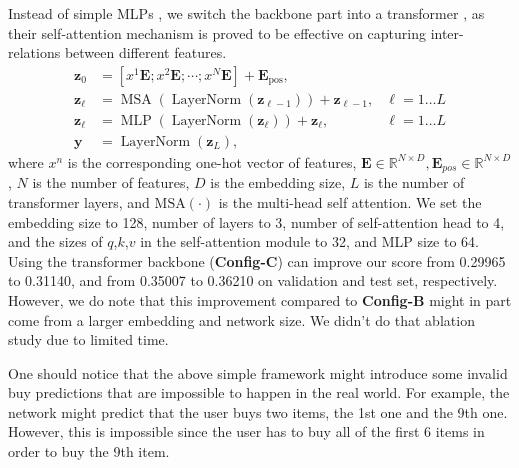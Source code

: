 Instead of simple MLPs \cite{din, ncf}, we switch the backbone part into a transformer \cite{transformer}, as their self-attention mechanism is proved to be effective on capturing inter-relations between different features.
\begin{equation}
\begin{aligned}
\mathbf{z}_{0} &=\left[x^{1} \mathbf{E} ; x^{2} \mathbf{E}; \cdots; x^{N} \mathbf{E}\right]+\mathbf{E}_{\text{pos}}, &  \\
\mathbf{z}_{\ell} &=\operatorname{MSA}\left(\operatorname{LayerNorm}\left(\mathbf{z}_{\ell-1}\right)\right)+\mathbf{z}_{\ell-1}, & \ell=1 \ldots L \\
\mathbf{z}_{\ell} &=\operatorname{MLP}\left(\operatorname{LayerNorm}\left(\mathbf{z}_{\ell}\right)\right)+\mathbf{z}_{\ell}, & \ell=1 \ldots L \\
\mathbf{y} &=\operatorname{LayerNorm}\left(\mathbf{z}_{L}\right), &
\end{aligned}
\end{equation}
where $x^{n}$ is the corresponding one-hot vector of features, $\mathbf{E} \in \mathbb{R}^{N \times D}, \mathbf{E}_{pos} \in \mathbb{R}^{N \times D}$, $N$ is the number of features, $D$ is the embedding size, $L$ is the number of transformer layers, and $\text{MSA}(\cdot)$ is the multi-head self attention.
%
We set the embedding size to 128, number of layers to 3, number of self-attention head to 4, and the sizes of $q$,$k$,$v$ in the self-attention module to 32, and MLP size to 64.
%
Using the transformer backbone (\textbf{Config-C}) can improve our score from 0.29965 to 0.31140, and from 0.35007 to 0.36210 on validation and test set, respectively.
However, we do note that this improvement compared to \textbf{Config-B} might in part come from a larger embedding and network size. We didn't do that ablation study due to limited time.


One should notice that the above simple framework might introduce some invalid buy predictions that are impossible to happen in the real world.
For example, the network might predict that the user buys two items, the 1st one and the 9th one. 
However, this is impossible since the user has to buy all of the first 6 items in order to buy the 9th item.

